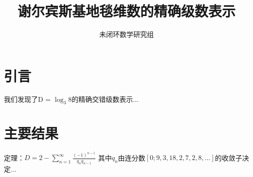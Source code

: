 \documentclass{article}
\title{谢尔宾斯基地毯维数的精确级数表示}
\author{未闭环数学研究组}
\begin{document}
\maketitle
\section{引言}
我们发现了D = $\log_3 8$的精确交错级数表示...
\section{主要结果}
定理：$D = 2 - \sum_{n=1}^{\infty} \frac{(-1)^{n-1}}{q_n q_{n-1}}$
其中$q_n$由连分数$[0;9,3,18,2,7,2,8,\dots]$的收敛子决定...
\end{document}
